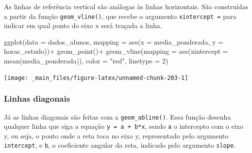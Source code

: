 \documentclass[
  brazilian,
]{book}
\newenvironment{Shaded}{\begin{snugshade}}{\end{snugshade}}
\newcommand{\AttributeTok}[1]{\textcolor[rgb]{0.77,0.63,0.00}{#1}}
\newcommand{\CommentTok}[1]{\textcolor[rgb]{0.56,0.35,0.01}{\textit{#1}}}
\newcommand{\DecValTok}[1]{\textcolor[rgb]{0.00,0.00,0.81}{#1}}
\newcommand{\FunctionTok}[1]{\textcolor[rgb]{0.00,0.00,0.00}{#1}}
\newcommand{\NormalTok}[1]{#1}
\newcommand{\SpecialCharTok}[1]{\textcolor[rgb]{0.00,0.00,0.00}{#1}}
\newcommand{\StringTok}[1]{\textcolor[rgb]{0.31,0.60,0.02}{#1}}
\begin{document}
As linhas de referência vertical são análogas às linhas horizontais. São construídas a partir da função \texttt{geom\_vline()}, que recebe o argumento \texttt{xintercept\ =} para indicar em qual ponto do eixo x será traçada a linha.

\begin{Shaded}
\begin{Highlighting}[]
\FunctionTok{ggplot}\NormalTok{(}\AttributeTok{data =}\NormalTok{ dados\_alunos,}
       \AttributeTok{mapping =} \FunctionTok{aes}\NormalTok{(}\AttributeTok{x =}\NormalTok{ media\_ponderada,}
                     \AttributeTok{y =}\NormalTok{ horas\_estudo))}\SpecialCharTok{+}
  \FunctionTok{geom\_point}\NormalTok{()}\SpecialCharTok{+}
  \FunctionTok{geom\_vline}\NormalTok{(}\AttributeTok{mapping =} \FunctionTok{aes}\NormalTok{(}\AttributeTok{xintercept =} \FunctionTok{mean}\NormalTok{(media\_ponderada)),}
             \AttributeTok{color =} \StringTok{"red"}\NormalTok{,}
             \AttributeTok{linetype =} \DecValTok{2}\NormalTok{)}
\end{Highlighting}
\end{Shaded}

\begin{center}\texttt{[image: \_main\_files/figure-latex/unnamed-chunk-203-1]} \end{center}

\hypertarget{linhas-diagonais}{%
\subsubsection*{Linhas diagonais}\label{linhas-diagonais}}

Já as linhas diagonais são feitas com a \texttt{geom\_abline()}. Essa função desenha qualquer linha que siga a equação \texttt{y\ =\ a\ +\ b*x}, sendo \texttt{a} o intercepto com o eixo y, ou seja, o ponto onde a reta toca no eixo y, representado pelo argumento \texttt{intercept}, e \texttt{b}, o coeficiente angular da reta, indicado pelo argumento \texttt{slope}.

\begin{Shaded}
\end{Shaded}
\end{document}
